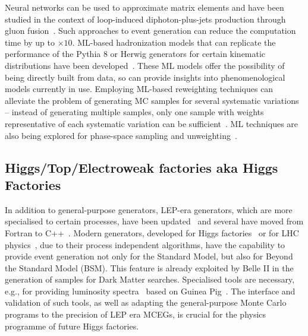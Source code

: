 \documentclass[10pt,a4paper]{article}
\begin{document}
Neural networks can be used to approximate matrix elements and have been studied
in the context of loop-induced diphoton-plus-jets production through gluon
fusion~\cite{Moodie:2022flt}. Such approaches to event generation can reduce the
computation time by up to $\times 10$. ML-based hadronization models that can
replicate the performance of the Pythia 8 or Herwig generators for certain kinematic
distributions have been
developed~\cite{Ilten:2022jfm, Bierlich:2023fmh, Ghosh:2022zdz, Chan:2023ume}.
These ML models offer the possibility of being directly built from data, so can
provide insights into phenomenological models currently in use. Employing ML-based
reweighting techniques can alleviate the problem of generating MC samples
for several systematic variations -- instead of generating multiple samples,
only one sample with weights representative of each systematic variation can be
sufficient~\cite{CMS:2024jdl}. ML techniques are also being explored
for phase-space sampling and unweighting~\cite{Butter:2022rso}.

\subsection{Higgs/Top/Electroweak factories aka Higgs
Factories}\label{higgstopelectroweak-factories-aka-higgs-factories}

In addition to general-purpose generators, LEP-era generators, which are more
specialised to certain processes, have been
updated~\cite{Jadach:1999vf,CarloniCalame:2003yt,Jadach:1991by,Denner:2000bj}
and several have moved from Fortran to C++~\cite{Jadach:2022mbe, Sjostrand:2014zea}.
Modern generators, developed for Higgs factories~\cite{Kilian:2007gr, Sherpa:2024mfk}
or for LHC physics~\cite{Frixione:2021zdp,Sherpa:2019gpd},  due to their process
independent algorithms, have the capability to provide event generation not only
for the Standard Model, but also for Beyond the Standard Model (BSM). This feature
is already exploited by Belle II in the generation of samples for Dark Matter searches.
Specialised tools are necessary, e.g., for providing luminosity
spectra~\cite{Ohl:1996fi} based on Guinea Pig~\cite{Schulte:1998au}.
The interface and validation of such tools, as well as adapting the general-purpose
Monte Carlo programs to the precision of LEP era MCEGs, is crucial for the
physics programme of future Higgs factories.
\end{document}

